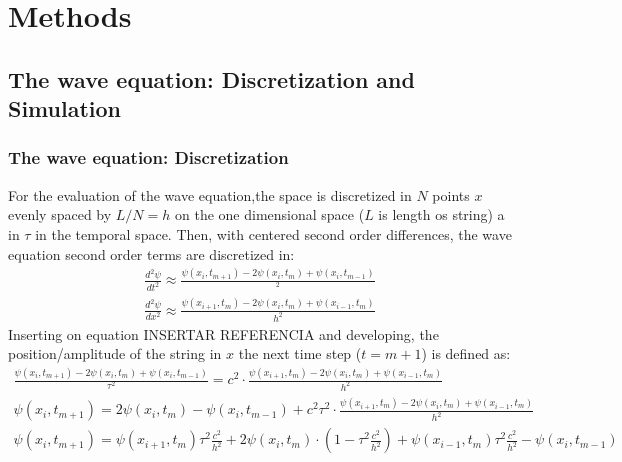 \section{Methods}

\subsection{The wave equation: Discretization and Simulation}
\subsubsection{The wave equation: Discretization}
For the evaluation of the wave equation,the space is discretized in $N$ points $x$ evenly spaced by $L/N = h$ on the one dimensional space ($L$ is length os string) a in $\tau$ in the temporal space.
Then, with centered second order differences, the wave equation second order terms are discretized in:
\begin{equation}
    \begin{aligned}
        \frac{d^{2} \psi}{dt^2} \approx \frac{\psi(x_{i},t_{m+1}) - 2\psi(x_i,t_{m}) + \psi(x_{i},t_{m-1})}{^2} \\
        \frac{d^{2} \psi}{dx^2} \approx \frac{\psi(x_{i+1},t_{m}) - 2\psi(x_i,t_{m}) + \psi(x_{i-1},t_{m})}{h^2}
    \end{aligned}
\end{equation}
Inserting on equation INSERTAR REFERENCIA and developing, the position/amplitude of the string in $x$ the next time step ($t= m+1$)
is defined as:
\begin{equation}
    \begin{aligned}
        \frac{\psi(x_{i},t_{m+1}) - 2\psi(x_i,t_{m}) + \psi(x_{i},t_{m-1})}{\tau^2} =
        c^{2} \cdot \frac{\psi(x_{i+1},t_{m}) - 2\psi(x_i,t_{m}) + \psi(x_{i-1},t_{m})}{h^2}                                                                         \\
        \psi(x_{i},t_{m+1}) = 2\psi(x_i,t_{m}) - \psi(x_{i},t_{m-1}) + c^{2} \tau^{2} \cdot \frac{\psi(x_{i+1},t_{m}) - 2\psi(x_i,t_{m}) + \psi(x_{i-1},t_{m})}{h^2} \\
        \psi(x_{i},t_{m+1}) = \psi(x_{i+1},t_{m})\tau^{2}\frac{c^{2}}{h^2} + 2\psi(x_i,t_{m}) \cdot (1 - \tau^{2}\frac{c^{2}}{h^2})  + \psi(x_{i-1},t_{m})\tau^{2}\frac{c^{2}}{h^2} -  \psi(x_{i},t_{m-1})
    \end{aligned}
\end{equation}

